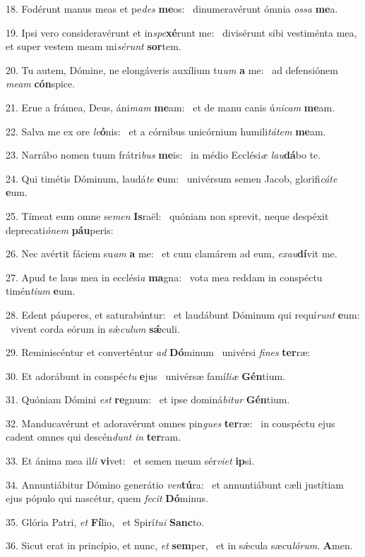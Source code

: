 18. Fodérunt manus meas et pe\textit{des} \textbf{me}os: \ast\  dinumeravérunt ómnia \textit{os}\textit{sa} \textbf{me}a.\

19. Ipsi vero consideravérunt et in\textit{spe}\textbf{xé}runt me: \ast\  divisérunt sibi vestiménta mea, et super vestem meam mi\textit{sé}\textit{runt} \textbf{sor}tem.\

20. Tu autem, Dómine, ne elongáveris auxílium tu\textit{um} \textbf{a} me: \ast\  ad defensiónem \textit{me}\textit{am} \textbf{cón}spice.\

21. Erue a frámea, Deus, áni\textit{mam} \textbf{me}am: \ast\  et de manu canis ú\textit{ni}\textit{cam} \textbf{me}am.\

22. Salva me ex ore \textit{le}\textbf{ó}nis: \ast\  et a córnibus unicórnium humili\textit{tá}\textit{tem} \textbf{me}am.\

23. Narrábo nomen tuum frátri\textit{bus} \textbf{me}is: \ast\  in médio Ecclési\textit{æ} \textit{lau}\textbf{dá}bo te.\

24. Qui timétis Dóminum, laudá\textit{te} \textbf{e}um: \ast\  univérsum semen Jacob, glorifi\textit{cá}\textit{te} \textbf{e}um.\

25. Tímeat eum omne se\textit{men} \textbf{Is}raël: \ast\  quóniam non sprevit, neque despéxit deprecati\textit{ó}\textit{nem} \textbf{páu}peris:\

26. Nec avértit fáciem su\textit{am} \textbf{a} me: \ast\  et cum clamárem ad eum, \textit{ex}\textit{au}\textbf{dí}vit me.\

27. Apud te laus mea in ecclési\textit{a} \textbf{ma}gna: \ast\  vota mea reddam in conspéctu timén\textit{ti}\textit{um} \textbf{e}um.\

28. Edent páuperes, et saturabúntur: \dag\  et laudábunt Dóminum qui requí\textit{runt} \textbf{e}um: \ast\  vivent corda eórum in sǽ\textit{cu}\textit{lum} \textbf{sǽ}culi.\

29. Reminiscéntur et converténtur \textit{ad} \textbf{Dó}minum \ast\  univérsi \textit{fi}\textit{nes} \textbf{ter}ræ:\

30. Et adorábunt in conspéc\textit{tu} \textbf{e}jus \ast\  univérsæ famí\textit{li}\textit{æ} \textbf{Gén}tium.\

31. Quóniam Dómini \textit{est} \textbf{re}gnum: \ast\  et ipse dominá\textit{bi}\textit{tur} \textbf{Gén}tium.\

32. Manducavérunt et adoravérunt omnes pin\textit{gues} \textbf{ter}ræ: \ast\  in conspéctu ejus cadent omnes qui descén\textit{dunt} \textit{in} \textbf{ter}ram.\

33. Et ánima mea il\textit{li} \textbf{vi}vet: \ast\  et semen meum sér\textit{vi}\textit{et} \textbf{ip}si.\

34. Annuntiábitur Dómino generátio \textit{ven}\textbf{tú}ra: \ast\  et annuntiábunt cæli justítiam ejus pópulo qui nascétur, quem \textit{fe}\textit{cit} \textbf{Dó}minus.\

35. Glória Patri, \textit{et} \textbf{Fí}lio, \ast\  et Spirí\textit{tu}\textit{i} \textbf{Sanc}to.\

36. Sicut erat in princípio, et nunc, \textit{et} \textbf{sem}per, \ast\  et in sǽcula sæcu\textit{ló}\textit{rum}. \textbf{A}men.\

